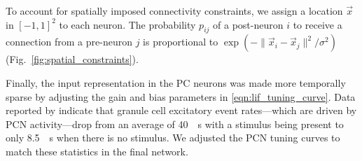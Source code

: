 To account for spatially imposed connectivity constraints, we assign a location $\vec x$ in $[-1, 1]^2$ to each neuron. The probability $p_{ij}$ of a post-neuron $i$ to receive a connection from a pre-neuron $j$ is proportional to $\exp \left(- \| \vec x_i - \vec x_j \|^2 / \sigma^{2} \right)$ (Fig.~\ref{fig:spatial_constraints}).

Finally, the input representation in the PC neurons was made more temporally sparse by adjusting the gain and bias parameters in \cref{eqn:lif_tuning_curve}.
Data reported by \citet{chadderton2004integration} indicate that granule cell excitatory event rates---which are driven by PCN activity---drop from an average of \SI{40}{\per\second} with a stimulus being present to only \SI{8.5}{\per\second} when there is no stimulus.
We adjusted the PCN tuning curves to match these statistics in the final network.

